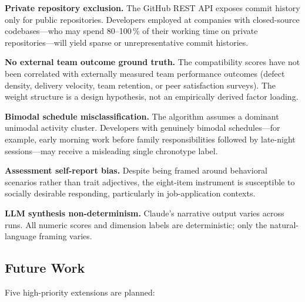 \documentclass[conference]{IEEEtran}
\begin{document}
\textbf{Private repository exclusion.}  The GitHub REST API exposes
commit history only for public repositories.  Developers employed
at companies with closed-source codebases---who may spend 80--100\,\%
of their working time on private repositories---will yield sparse
or unrepresentative commit histories.

\textbf{No external team outcome ground truth.}  The compatibility
scores have not been correlated with externally measured team
performance outcomes (defect density, delivery velocity, team
retention, or peer satisfaction surveys).  The weight structure
is a design hypothesis, not an empirically derived factor loading.

\textbf{Bimodal schedule misclassification.}  The algorithm assumes
a dominant unimodal activity cluster.  Developers with genuinely
bimodal schedules---for example, early morning work before family
responsibilities followed by late-night sessions---may receive a
misleading single chronotype label.

\textbf{Assessment self-report bias.}  Despite being framed around
behavioral scenarios rather than trait adjectives, the eight-item
instrument is susceptible to socially desirable responding,
particularly in job-application contexts.

\textbf{LLM synthesis non-determinism.}  Claude's narrative output
varies across runs.  All numeric scores and dimension labels are
deterministic; only the natural-language framing varies.

\subsection{Future Work}

Five high-priority extensions are planned:
\end{document}
